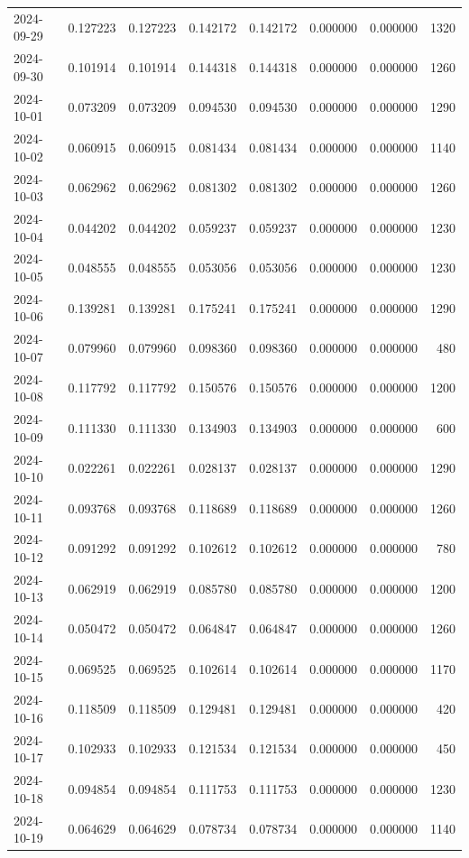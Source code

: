 \begin{tabular}{lrrrrrrr}
2024-09-29 & 0.127223 & 0.127223 & 0.142172 & 0.142172 & 0.000000 & 0.000000 & 1320 \\
2024-09-30 & 0.101914 & 0.101914 & 0.144318 & 0.144318 & 0.000000 & 0.000000 & 1260 \\
2024-10-01 & 0.073209 & 0.073209 & 0.094530 & 0.094530 & 0.000000 & 0.000000 & 1290 \\
2024-10-02 & 0.060915 & 0.060915 & 0.081434 & 0.081434 & 0.000000 & 0.000000 & 1140 \\
2024-10-03 & 0.062962 & 0.062962 & 0.081302 & 0.081302 & 0.000000 & 0.000000 & 1260 \\
2024-10-04 & 0.044202 & 0.044202 & 0.059237 & 0.059237 & 0.000000 & 0.000000 & 1230 \\
2024-10-05 & 0.048555 & 0.048555 & 0.053056 & 0.053056 & 0.000000 & 0.000000 & 1230 \\
2024-10-06 & 0.139281 & 0.139281 & 0.175241 & 0.175241 & 0.000000 & 0.000000 & 1290 \\
2024-10-07 & 0.079960 & 0.079960 & 0.098360 & 0.098360 & 0.000000 & 0.000000 & 480 \\
2024-10-08 & 0.117792 & 0.117792 & 0.150576 & 0.150576 & 0.000000 & 0.000000 & 1200 \\
2024-10-09 & 0.111330 & 0.111330 & 0.134903 & 0.134903 & 0.000000 & 0.000000 & 600 \\
2024-10-10 & 0.022261 & 0.022261 & 0.028137 & 0.028137 & 0.000000 & 0.000000 & 1290 \\
2024-10-11 & 0.093768 & 0.093768 & 0.118689 & 0.118689 & 0.000000 & 0.000000 & 1260 \\
2024-10-12 & 0.091292 & 0.091292 & 0.102612 & 0.102612 & 0.000000 & 0.000000 & 780 \\
2024-10-13 & 0.062919 & 0.062919 & 0.085780 & 0.085780 & 0.000000 & 0.000000 & 1200 \\
2024-10-14 & 0.050472 & 0.050472 & 0.064847 & 0.064847 & 0.000000 & 0.000000 & 1260 \\
2024-10-15 & 0.069525 & 0.069525 & 0.102614 & 0.102614 & 0.000000 & 0.000000 & 1170 \\
2024-10-16 & 0.118509 & 0.118509 & 0.129481 & 0.129481 & 0.000000 & 0.000000 & 420 \\
2024-10-17 & 0.102933 & 0.102933 & 0.121534 & 0.121534 & 0.000000 & 0.000000 & 450 \\
2024-10-18 & 0.094854 & 0.094854 & 0.111753 & 0.111753 & 0.000000 & 0.000000 & 1230 \\
2024-10-19 & 0.064629 & 0.064629 & 0.078734 & 0.078734 & 0.000000 & 0.000000 & 1140 \\

\end{tabular}

